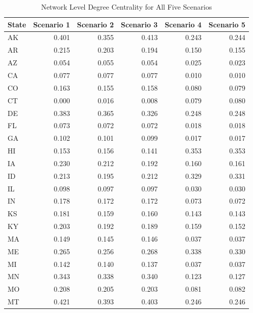 \documentclass[]{article}
\begin{document}
\begin{table}[!h]

\caption{\label{tab:unnamed-chunk-47}Network Level Degree Centrality for All Five Scenarios}
\centering
\begin{tabular}{l|r|r|r|r|r}
\hline
State & Scenario 1 & Scenario 2 & Scenario 3 & Scenario 4 & Scenario 5\\
\hline
\rowcolor{gray!6}  AK & 0.401 & 0.355 & 0.413 & 0.243 & 0.244\\
\hline
AR & 0.215 & 0.203 & 0.194 & 0.150 & 0.155\\
\hline
\rowcolor{gray!6}  AZ & 0.054 & 0.055 & 0.054 & 0.025 & 0.023\\
\hline
CA & 0.077 & 0.077 & 0.077 & 0.010 & 0.010\\
\hline
\rowcolor{gray!6}  CO & 0.163 & 0.155 & 0.158 & 0.080 & 0.079\\
\hline
CT & 0.000 & 0.016 & 0.008 & 0.079 & 0.080\\
\hline
\rowcolor{gray!6}  DE & 0.383 & 0.365 & 0.326 & 0.248 & 0.248\\
\hline
FL & 0.073 & 0.072 & 0.072 & 0.018 & 0.018\\
\hline
\rowcolor{gray!6}  GA & 0.102 & 0.101 & 0.099 & 0.017 & 0.017\\
\hline
HI & 0.153 & 0.156 & 0.141 & 0.353 & 0.353\\
\hline
\rowcolor{gray!6}  IA & 0.230 & 0.212 & 0.192 & 0.160 & 0.161\\
\hline
ID & 0.213 & 0.195 & 0.212 & 0.329 & 0.331\\
\hline
\rowcolor{gray!6}  IL & 0.098 & 0.097 & 0.097 & 0.030 & 0.030\\
\hline
IN & 0.178 & 0.172 & 0.172 & 0.073 & 0.072\\
\hline
\rowcolor{gray!6}  KS & 0.181 & 0.159 & 0.160 & 0.143 & 0.143\\
\hline
KY & 0.203 & 0.192 & 0.189 & 0.159 & 0.152\\
\hline
\rowcolor{gray!6}  MA & 0.149 & 0.145 & 0.146 & 0.037 & 0.037\\
\hline
ME & 0.265 & 0.256 & 0.268 & 0.338 & 0.330\\
\hline
\rowcolor{gray!6}  MI & 0.142 & 0.140 & 0.137 & 0.037 & 0.037\\
\hline
MN & 0.343 & 0.338 & 0.340 & 0.123 & 0.127\\
\hline
\rowcolor{gray!6}  MO & 0.208 & 0.205 & 0.203 & 0.081 & 0.082\\
\hline
MT & 0.421 & 0.393 & 0.403 & 0.246 & 0.246\\

\end{tabular}
\end{table}
\end{document}
